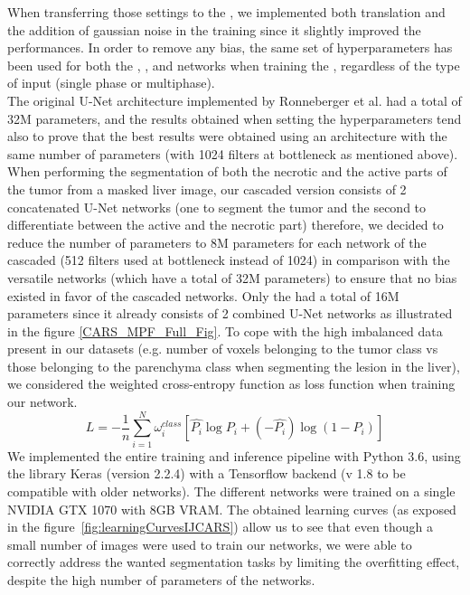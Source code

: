 When transferring those settings to the \textbf{}, 
we implemented both translation and the addition of gaussian
noise in the training since it slightly improved the performances.
In order to remove any bias, the same set of hyperparameters has been
used for both the , ,  and
 networks when training the \textbf{}, regardless of the
type of input (single phase or multiphase). \\
The original U-Net architecture implemented by Ronneberger et al. had a total of 32M parameters, and the results obtained when setting the hyperparameters tend also to prove that the best results were obtained using an architecture with the same number of parameters (with 1024 filters at bottleneck as mentioned above). When performing the segmentation of both the necrotic and the active parts of the tumor from a masked liver image, our cascaded version consists of 2 concatenated U-Net networks (one to segment the tumor and the second to differentiate between the active and the necrotic part) therefore, we decided to reduce the number of parameters to 8M parameters for each network of the cascaded (512 filters used at bottleneck instead of 1024) in comparison with the versatile networks (which have a total of 32M parameters) to ensure that no bias existed in favor of the cascaded networks.
Only the  had a total of 16M parameters since it already consists of 2 combined U-Net networks as illustrated in the figure \ref{CARS_MPF_Full_Fig}.
To cope with the high imbalanced data present in our datasets (e.g. number of voxels belonging to the tumor class vs those belonging to the parenchyma class when segmenting the lesion in the liver), we considered the weighted cross-entropy function as loss function when training our network. 
\begin{equation}
L = -\frac{1}{n} \sum_{i=1}^{N}\omega_i^{class}\left[\hat{P_i} \log P_i + (-\hat{P_i})\log (1 - P_i)\right]
\end{equation}
We implemented the entire training and inference pipeline with Python 3.6, using the library Keras (version 2.2.4) with a Tensorflow backend (v 1.8 to be compatible with older networks). The different networks were trained on a single NVIDIA GTX 1070 with 8GB VRAM. 
The obtained learning curves (as exposed in the figure \ref{fig:learningCurvesIJCARS}) allow us to see that even though a small number of images were used to train our networks, we were able to correctly address the wanted segmentation tasks by limiting the overfitting effect, despite the high number of parameters of the networks.
